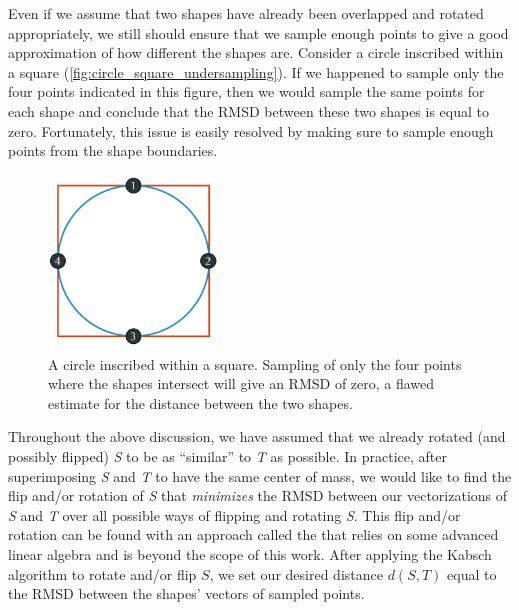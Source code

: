 \begin{qbox}\end{qbox}

Even if we assume that two shapes have already been overlapped and rotated appropriately, we still should ensure that we sample enough points to give a good approximation of how different the shapes are. Consider a circle inscribed within a square (\autoref{fig:circle_square_undersampling}). If we happened to sample only the four points indicated in this figure, then we would sample the same points for each shape and conclude that the RMSD between these two shapes is equal to zero. Fortunately, this issue is easily resolved by making sure to sample enough points from the shape boundaries.

\begin{figure}[h]
	\centering
	\mySfFamily
	\includegraphics[width = 0.4\textwidth]{../images_CMYK/circle_square_undersampling}
	\caption{A circle inscribed within a square. Sampling of only the four points where the shapes intersect will give an RMSD of zero, a flawed estimate for the distance between the two shapes.}
	\label{fig:circle_square_undersampling}
\end{figure}

Throughout the above discussion, we have assumed that we already rotated (and possibly flipped) \textit{S} to be as ``similar'' to \textit{T} as possible. In practice, after superimposing \textit{S} and \textit{T} to have the same center of mass, we would like to find the flip and/or rotation of \textit{S} that \textit{minimizes} the RMSD between our vectorizations of \textit{S} and \textit{T} over all possible ways of flipping and rotating \textit{S}. This flip and/or rotation can be found with an approach called the  that relies on some advanced linear algebra and is beyond the scope of this work. After applying the Kabsch algorithm to rotate and/or flip $S$, we set our desired distance $d(S, T)$ equal to the RMSD between the shapes' vectors of sampled points.

